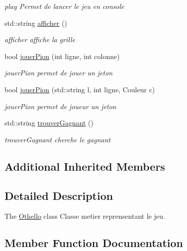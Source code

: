 \begin{DoxyCompactItemize}
\begin{DoxyCompactList}\small\item\em play Permet de lancer le jeu en console \end{DoxyCompactList}\item 
std\+::string \hyperlink{class_othello_ab9aeb646966e57f9db61b890fd4ecf79}{afficher} ()
\begin{DoxyCompactList}\small\item\em afficher affiche la grille \end{DoxyCompactList}\item 
bool \hyperlink{class_othello_ad193a2c07618fdd73d3c26c972a6bd50}{jouer\+Pion} (int ligne, int colonne)
\begin{DoxyCompactList}\small\item\em jouer\+Pion permet de jouer un jeton \end{DoxyCompactList}\item 
bool \hyperlink{class_othello_a4a2cf5c472f95c2fb84f63f4f1c50e66}{jouer\+Pion} (std\+::string l, int ligne, Couleur c)
\begin{DoxyCompactList}\small\item\em jouer\+Pion permet de joueur un jeton \end{DoxyCompactList}\item 
std\+::string \hyperlink{class_othello_a6aef7801395d5073ede14fda239450b0}{trouver\+Gagnant} ()
\begin{DoxyCompactList}\small\item\em trouver\+Gagnant cherche le gagnant \end{DoxyCompactList}\end{DoxyCompactItemize}
\subsection*{Additional Inherited Members}


\subsection{Detailed Description}
The \hyperlink{class_othello}{Othello} class Classe metier reprensentant le jeu. 

\subsection{Member Function Documentation}
\hypertarget{class_othello_ab9aeb646966e57f9db61b890fd4ecf79}{}
